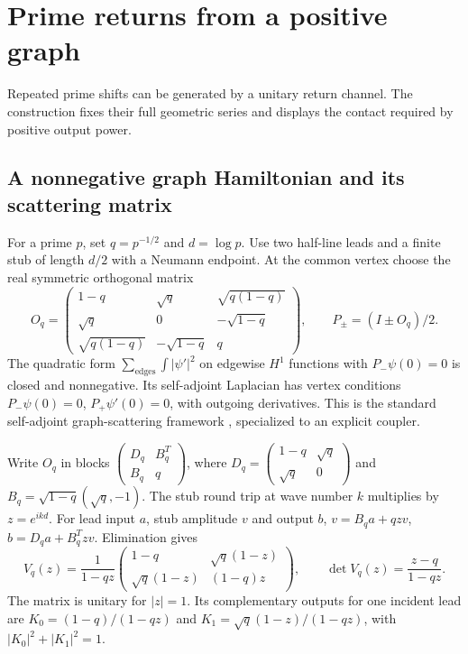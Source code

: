 \section{Prime returns from a positive graph}
\label{sec:prime-returns}
Repeated prime shifts can be generated by a unitary return channel.
The construction fixes their full geometric series and displays the
contact required by positive output power.

\subsection{A nonnegative graph Hamiltonian and its scattering matrix}
For a prime $p$, set $q=p^{-1/2}$ and $d=\log p$.
Use two half-line leads and a finite stub of length $d/2$ with a
Neumann endpoint. At the common vertex choose the real symmetric
orthogonal matrix
\[
O_q=
\begin{pmatrix}
1-q&\sqrt q&\sqrt{q(1-q)}\\
\sqrt q&0&-\sqrt{1-q}\\
\sqrt{q(1-q)}&-\sqrt{1-q}&q
\end{pmatrix},\qquad P_\pm=(I\pm O_q)/2.
\]
The quadratic form $\sum_{\text{edges}}\int|\psi'|^2$ on edgewise
$H^1$ functions with $P_-\psi(0)=0$ is closed and nonnegative.
Its self-adjoint Laplacian has vertex conditions
$P_-\psi(0)=0$, $P_+\psi'(0)=0$, with outgoing derivatives.
This is the standard self-adjoint graph-scattering framework
\cite{KostrykinSchrader}, specialized to an explicit coupler.

Write $O_q$ in blocks
$\left(\begin{smallmatrix}D_q&B_q^T\\B_q&q\end{smallmatrix}\right)$,
where
$D_q=\left(\begin{smallmatrix}1-q&\sqrt q\\\sqrt q&0\end{smallmatrix}\right)$
and $B_q=\sqrt{1-q}(\sqrt q,-1)$.
The stub round trip at wave number $k$ multiplies by $z=e^{ikd}$.
For lead input $a$, stub amplitude $v$ and output $b$,
$v=B_qa+qzv$, $b=D_qa+B_q^Tzv$. Elimination gives
\begin{equation}\label{prime:scattering}
V_q(z)=\frac1{1-qz}
\begin{pmatrix}
1-q&\sqrt q(1-z)\\
\sqrt q(1-z)&(1-q)z
\end{pmatrix},\qquad
\det V_q(z)=\frac{z-q}{1-qz}.
\end{equation}
The matrix is unitary for $|z|=1$. Its complementary outputs for
one incident lead are
$K_0=(1-q)/(1-qz)$ and
$K_1=\sqrt q(1-z)/(1-qz)$, with $|K_0|^2+|K_1|^2=1$.

